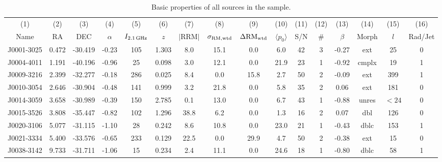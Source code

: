\documentclass{mnras}
\newcommand*\sigmaRMwtd{\sigma_{\rm RM, wtd}}
\newcommand*\gradRMwtd{\Delta{\rm RM_{wtd}}}
\begin{document}
\begin{table*}%
 \caption{Basic properties of all sources in the sample.}
 \scriptsize
 \centering
   \begin{tabular}{cccccccccccccccc}
    \hline\hline
       (1) & (2) & (3) & (4) & (5) & (6) & (7) & (8) & (9) & (10) & (11) & (12) & (13) & (14) & (15) & (16)  \\
Name  & RA & DEC & $\alpha$ &   $I_{2.1\,{\rm GHz}}$ &  $z$ &  $|$RRM$|$ &  $\sigmaRMwtd$ &  $\gradRMwtd$ &  $\langle p_{0} \rangle$ &  S/N &  \# &  $\beta$ &  Morph &  $l$ &  Rad/Jet \\
      \hline 
J0001-3025 & 0.472 & -30.419 & -0.23 & 105 & 1.303 & 8.0 & 15.1 & 0.0 & 6.0 & 42 & 3 & -0.27 & ext & 25 & 0 \\ 

J0004-4011 & 1.191 & -40.196 & -0.96 & 25 & 0.098 & 3.0 & 12.1 & 0.0 & 21.9 & 23 & 1 & -0.92 & cmplx & 19 & 1 \\ 

J0009-3216 & 2.399 & -32.277 & -0.18 & 286 & 0.025 & 8.4 & 0.0 & 15.8 & 2.7 & 50 & 2 & -0.09 & ext & 399 & 1 \\ 

J0010-3054 & 2.646 & -30.904 & -0.48 & 141 & 0.999 & 3.2 & 21.8 & 0.0 & 5.8 & 35 & 2 & 0.06 & ext & 181 & 0 \\ 

J0014-3059 & 3.658 & -30.989 & -0.39 & 150 & 2.785 & 0.1 & 13.0 & 0.0 & 6.7 & 43 & 1 & -0.88 & unres & $<24$ & 0 \\ 

J0015-3526 & 3.808 & -35.447 & -0.82 & 102 & 1.296 & 38.8 & 6.2 & 0.0 & 1.3 & 16 & 2 & 0.07 & dbl & 126 & 0 \\ 

J0020-3106 & 5.077 & -31.115 & -1.10 & 28 & 0.242 & 8.6 & 10.8 & 0.0 & 23.0 & 21 & 1 & -0.43 & dblc & 153 & 1 \\ 

J0021-3334 & 5.400 & -33.576 & -0.65 & 233 & 0.129 & 22.5 & 0.0 & 29.9 & 4.7 & 50 & 2 & -0.38 & ext & 15 & 0 \\ 

J0038-3142 & 9.733 & -31.711 & -1.06 & 15 & 0.234 & 2.4 & 11.1 & 0.0 & 24.6 & 18 & 1 & -0.80 & dblc & 58 & 1 \\ 


\end{tabular}
\end{table*}
\end{document}
